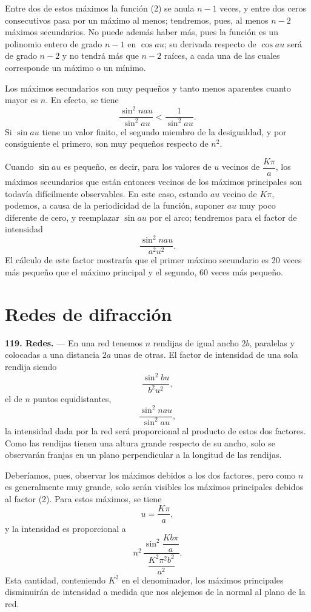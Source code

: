 Entre dos de estos máximos la función (2) se anula $n-1$ veces, y entre
dos ceros consecutivos pasa por un máximo al menos; tendremos, pues, al
menos $n-2$ máximos secundarios. No puede además haber más, pues la
función es un polinomio entero de grado $n-1$ en $\cos au$; su derivada
respecto de $\cos au$ será de grado $n-2$ y no tendrá más que $n-2$
raíces, a cada una de las cuales corresponde un máximo o un mínimo.

Los máximos secundarios son muy pequeños y tanto menos aparentes cuanto
mayor es $n$. En efecto, se tiene
\[
\frac{\sin^2 nau}{\sin^2 au} < \frac{1}{\sin^2 au}.
\]
Si $\sin au$ tiene un valor finito, el segundo miembro de la desigualdad,
y por consiguiente el primero, son muy pequeños respecto de $n^2$.

Cuando $\sin au$ es pequeño, es decir, para los valores de $u$ vecinos de
$\dfrac{K\pi}{a}$, los máximos secundarios que están entonces vecinos de
los máximos principales son todavía difícilmente observables. En este
caso, estando $au$ vecino de $K\pi$, podemos, a causa de la periodicidad
de la función, suponer $au$ muy poco diferente de cero, y reemplazar
$\sin au$ por el arco; tendremos para el factor de intensidad
\[
\frac{\sin^2 nau}{a^2u^2}.
\]
El cálculo de este factor mostraría que el primer máximo secundario es 20
veces más pequeño que el máximo principal y el segundo, 60 veces más
pequeño.

\section{Redes de difracción}

\noindent\textbf{119. Redes.} — En una red tenemos $n$ rendijas de igual
ancho $2b$, paralelas y colocadas a una distancia $2a$ unas de otras. El
factor de intensidad de una sola rendija siendo
\begin{equation}
\frac{\sin^2 bu}{b^2u^2},
\tag{1}
\end{equation}
el de $n$ puntos equidistantes,
\begin{equation}
\frac{\sin^2 nau}{\sin^2 au},
\tag{2}
\end{equation}
la intensidad dada por la red será proporcional al producto de estos dos
factores. Como las rendijas tienen una altura grande respecto de su
ancho, solo se observarán franjas en un plano perpendicular a la longitud
de las rendijas.

Deberíamos, pues, observar los máximos debidos a los dos factores, pero
como $n$ es generalmente muy grande, solo serán visibles los máximos
principales debidos al factor (2). Para estos máximos, se tiene
\[
u=\frac{K\pi}{a},
\]
y la intensidad es proporcional a
\begin{equation}
n^2\,\dfrac{\sin^2\dfrac{Kb\pi}{a}}{\dfrac{K^2\pi^2b^2}{a^2}}.
\tag{3}
\end{equation}
Esta cantidad, conteniendo $K^2$ en el denominador, los máximos
principales disminuirán de intensidad a medida que nos alejemos de la
normal al plano de la red.

